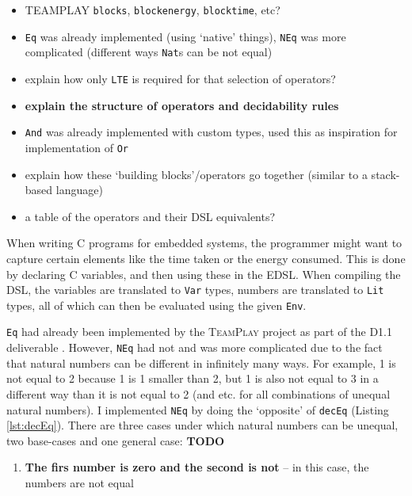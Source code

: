 \begin{itemize}
	\item TEAMPLAY \texttt{blocks}, \texttt{blockenergy}, \texttt{blocktime},
		  etc?
	\item \texttt{Eq} was already implemented (using `native' things),
		  \texttt{NEq} was more complicated (different ways \texttt{Nat}s can be
		  not equal)
	\item explain how only \texttt{LTE} is required for that selection of
		  operators?
    \item \textbf{explain the structure of operators and decidability rules}
	\item \texttt{And} was already implemented with custom types, used this as
		  inspiration for implementation of \texttt{Or}
	\item explain how these `building blocks'/operators go together (similar to
		  a stack-based language)
    \item a table of the operators and their DSL equivalents?
\end{itemize}

When writing C programs for embedded systems, the programmer might want to capture certain elements like the time taken or the energy consumed. This is done by declaring C variables, and then using these in the EDSL. When compiling the DSL, the variables are translated to \texttt{Var} types, numbers are translated to \texttt{Lit} types, all of which can then be evaluated using the given \texttt{Env}.
\\\par

\texttt{Eq} had already been implemented by the \textsc{TeamPlay} project as part of the D1.1 deliverable \cite{teamplay:d1.1}. However, \texttt{NEq} had not and was more complicated due to the fact that natural numbers can be different in infinitely many ways. For example, 1 is not equal to 2 because 1 is 1 smaller than 2, but 1 is also not equal to 3 in a different way than it is not equal to 2 (and etc. for all combinations of unequal natural numbers). I implemented \texttt{NEq} by doing the `opposite' of \texttt{decEq} (Listing \ref{lst:decEq}). There are three cases under which natural numbers can be unequal, two base-cases and one general case: \textbf{TODO}
\begin{enumerate}
    \item \textbf{The firs number is zero and the second is not} -- in this case, the numbers are not equal
\end{enumerate}
